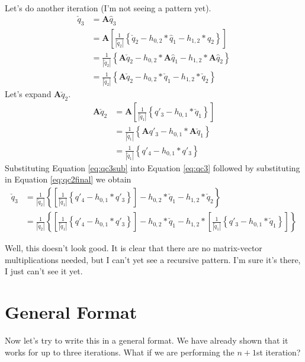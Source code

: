 \documentclass[12pt]{article}
\newcommand{\A}{\mathbf{A}}
\newcommand{\qp}[1]{q'_{#1}}
\newcommand{\qh}[1]{\hat{q}_{#1}}
\newcommand{\qt}[1]{\tilde{q}_{#1}}
\newcommand{\qc}[1]{\check{q}_{#1}}
\newcommand{\Ap}[1]{\A \qp{#1}}
\newcommand{\Ah}[1]{\A \qh{#1}}
\newcommand{\Ac}[1]{\A \qc{#1}}
\begin{document}
Let's do another iteration (I'm not seeing a pattern yet).
\begin{subequations}
    \begin{align}
        \qc{3} &= \Ah{3} \\
        &= \A \left[ \frac{1}{\left|\qt{2}\right|} \left\{\qc{2} - h_{0,2}*\qh{1} - h_{1,2}*\qh{2} \right\} \right] \\
        &= \frac{1}{\left|\qt{2}\right|} \left\{\Ac{2} - h_{0,2}*\Ah{1} - h_{1,2}*\Ah{2} \right\} \\
        &= \frac{1}{\left|\qt{2}\right|} \left\{\Ac{2} - h_{0,2}*\qc{1} - h_{1,2}*\qc{2} \right\}
        \label{eq:qc3}
    \end{align}
\end{subequations}
Let's expand $\Ac{2}$.
\begin{subequations}
    \begin{align}
        \Ac{2} &= \A \left[\frac{1}{\left|\qt{1}\right|} \left\{\qp{3}-h_{0,1}*\qc{1}\right\}\right] \\
         &= \frac{1}{\left|\qt{1}\right|} \left\{\Ap{3}-h_{0,1}*\Ac{1}\right\} \\
         &= \frac{1}{\left|\qt{1}\right|} \left\{\qp{4}-h_{0,1}*\qp{3}\right\}
        \label{eq:qc3sub}
    \end{align}
\end{subequations}
Substituting Equation \ref{eq:qc3sub} into Equation \ref{eq:qc3} followed by substituting in Equation \ref{eq:qc2final} we obtain
\begin{subequations}
    \begin{align}
        \qc{3} &= \frac{1}{\left|\qt{2}\right|} \left\{\left[\frac{1}{\left|\qt{1}\right|} \left\{\qp{4}-h_{0,1}*\qp{3}\right\}\right] - h_{0,2}*\qc{1} - h_{1,2}*\qc{2} \right\} \\
         &= \frac{1}{\left|\qt{2}\right|} \left\{\left[\frac{1}{\left|\qt{1}\right|} \left\{\qp{4}-h_{0,1}*\qp{3}\right\}\right] - h_{0,2}*\qc{1} - h_{1,2}*\left[\frac{1}{\left|\qt{1}\right|} \left\{\qp{3}-h_{0,1}*\qc{1}\right\}\right] \right\}
    \end{align}
\end{subequations}

Well, this doesn't look good.  It is clear that there are no matrix-vector multiplications needed, but I can't yet see a recursive pattern.  I'm sure it's there, I just can't see it yet.  

\section{General Format}
Now let's try to write this in a general format.  We have already shown that it works for up to three iterations.  What if we are performing the $n+1$st iteration?
\end{document}
